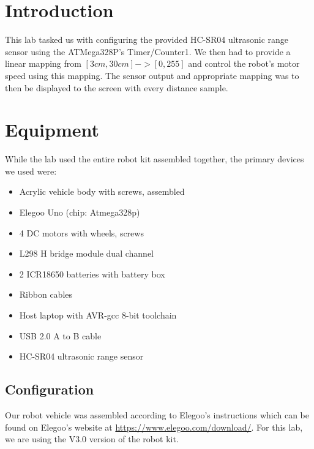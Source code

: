 \documentclass[letterpaper,11pt]{texMemo} %
\begin{document}
\maketitle %


\section*{Introduction}
This lab tasked us with configuring the provided HC-SR04 ultrasonic range sensor using the ATMega328P's Timer/Counter1. We then had to provide a linear mapping from $[3cm,30cm]->[0,255]$ and control the robot's motor speed using this mapping. The sensor output and appropriate mapping was to then be displayed to the screen with every distance sample.

\section*{Equipment}
While the lab used the entire robot kit assembled together, the primary devices
we used were:

\begin{itemize}
    \item Acrylic vehicle body with screws, assembled
    \item Elegoo Uno (chip: Atmega328p)
    \item 4 DC motors with wheels, screws 
    \item L298 H bridge module dual channel
    \item 2 ICR18650 batteries with battery box
    \item Ribbon cables
    \item Host laptop with AVR-gcc 8-bit toolchain
    \item USB 2.0 A to B cable
    \item HC-SR04 ultrasonic range sensor
\end{itemize}

\subsection*{Configuration}
Our robot vehicle was assembled according to Elegoo's instructions which can be found
on Elegoo's website at \url{https://www.elegoo.com/download/}. For this lab, we are
using the V3.0 version of the robot kit.
\end{document}
